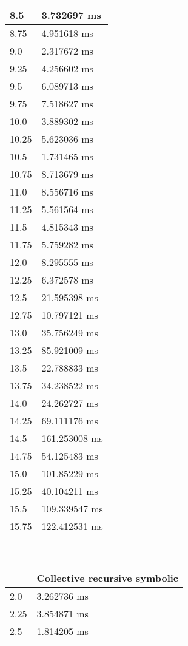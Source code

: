 \begin{multicols}{2}
\begin{tabular}{|l|l|}
		8.5 & 3.732697 ms \\ \hline
		8.75 & 4.951618 ms \\ \hline
		9.0 & 2.317672 ms \\ \hline
		9.25 & 4.256602 ms \\ \hline
		9.5 & 6.089713 ms \\ \hline
		9.75 & 7.518627 ms \\ \hline
		10.0 & 3.889302 ms \\ \hline
		10.25 & 5.623036 ms \\ \hline
		10.5 & 1.731465 ms \\ \hline
		10.75 & 8.713679 ms \\ \hline
		11.0 & 8.556716 ms \\ \hline
		11.25 & 5.561564 ms \\ \hline
		11.5 & 4.815343 ms \\ \hline
		11.75 & 5.759282 ms \\ \hline
		12.0 & 8.295555 ms \\ \hline
		12.25 & 6.372578 ms \\ \hline
		12.5 & 21.595398 ms \\ \hline
		12.75 & 10.797121 ms \\ \hline
		13.0 & 35.756249 ms \\ \hline
		13.25 & 85.921009 ms \\ \hline
		13.5 & 22.788833 ms \\ \hline
		13.75 & 34.238522 ms \\ \hline
		14.0 & 24.262727 ms \\ \hline
		14.25 & 69.111176 ms \\ \hline
		14.5 & 161.253008 ms \\ \hline
		14.75 & 54.125483 ms \\ \hline
		15.0 & 101.85229 ms \\ \hline
		15.25 & 40.104211 ms \\ \hline
		15.5 & 109.339547 ms \\ \hline
		15.75 & 122.412531 ms \\ \hline
	\end{tabular}\\
	\begin{tabular}{|l|l|}
		\hline
		& Collective recursive symbolic \\ \hline
		2.0 & 3.262736 ms \\ \hline
		2.25 & 3.854871 ms \\ \hline
		2.5 & 1.814205 ms \\ \hline

\end{tabular}
\end{multicols}
